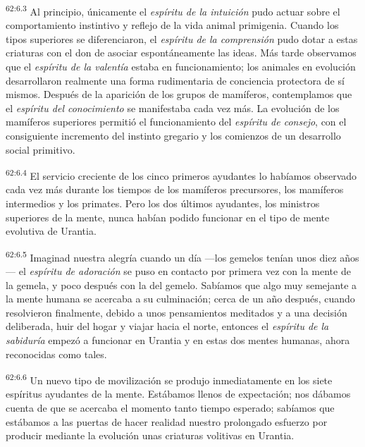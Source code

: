 \par
\textsuperscript{62:6.3} Al principio, únicamente el \textit{espíritu de la intuición} pudo actuar sobre el comportamiento instintivo y reflejo de la vida animal primigenia. Cuando los tipos superiores se diferenciaron, el \textit{espíritu de la comprensión} pudo dotar a estas criaturas con el don de asociar espontáneamente las ideas. Más tarde observamos que el \textit{espíritu de la valentía} estaba en funcionamiento; los animales en evolución desarrollaron realmente una forma rudimentaria de conciencia protectora de sí mismos. Después de la aparición de los grupos de mamíferos, contemplamos que el \textit{espíritu del conocimiento} se manifestaba cada vez más. La evolución de los mamíferos superiores permitió el funcionamiento del \textit{espíritu de consejo}, con el consiguiente incremento del instinto gregario y los comienzos de un desarrollo social primitivo.

\par
\textsuperscript{62:6.4} El servicio creciente de los cinco primeros ayudantes lo habíamos observado cada vez más durante los tiempos de los mamíferos precursores, los mamíferos intermedios y los primates. Pero los dos últimos ayudantes, los ministros superiores de la mente, nunca habían podido funcionar en el tipo de mente evolutiva de Urantia.

\par
\textsuperscript{62:6.5} Imaginad nuestra alegría cuando un día ---los gemelos tenían unos diez años--- el \textit{espíritu de adoración} se puso en contacto por primera vez con la mente de la gemela, y poco después con la del gemelo. Sabíamos que algo muy semejante a la mente humana se acercaba a su culminación; cerca de un año después, cuando resolvieron finalmente, debido a unos pensamientos meditados y a una decisión deliberada, huir del hogar y viajar hacia el norte, entonces el \textit{espíritu de la sabiduría} empezó a funcionar en Urantia y en estas dos mentes humanas, ahora reconocidas como tales.

\par
\textsuperscript{62:6.6} Un nuevo tipo de movilización se produjo inmediatamente en los siete espíritus ayudantes de la mente. Estábamos llenos de expectación; nos dábamos cuenta de que se acercaba el momento tanto tiempo esperado; sabíamos que estábamos a las puertas de hacer realidad nuestro prolongado esfuerzo por producir mediante la evolución unas criaturas volitivas en Urantia.

